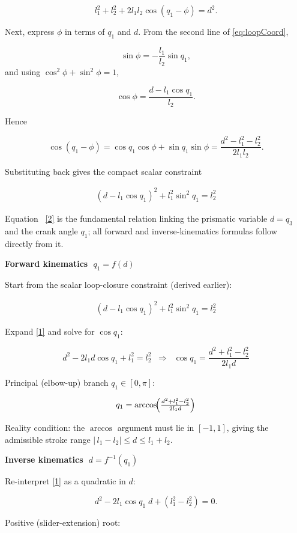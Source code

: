\documentclass[12pt,a4paper]{article}
\begin{document}
\[
l_{1}^{2} + l_{2}^{2} + 2l_{1}l_{2}\cos(q_{1}-\phi) = d^{2}.
\]

Next, express \(\phi\) in terms of \(q_{1}\) and \(d\).
From the second line of \eqref{eq:loopCoord},

\[
\sin\phi = -\frac{l_{1}}{l_{2}}\sin q_{1},
\]
and using \(\cos^{2}\phi+\sin^{2}\phi=1\),

\[
\cos\phi = \frac{d - l_{1}\cos q_{1}}{l_{2}}.
\]

Hence

\[
\cos(q_{1}-\phi)
        = \cos q_{1}\cos\phi + \sin q_{1}\sin\phi
        = \frac{d^{2} - l_{1}^{2} - l_{2}^{2}}{2l_{1}l_{2}}.
\]

Substituting back gives the compact scalar constraint

\begin{align}\label{2}
(d - l_{1}\cos q_{1})^{2} + l_{1}^{2}\sin^{2}q_{1} = l_{2}^{2}
\end{align}

Equation ~\eqref{2} is the fundamental relation linking
the prismatic variable \(d=q_{3}\) and the crank angle \(q_{1}\);
all forward and inverse-kinematics formulas follow directly from it.

\textbf{Forward kinematics  \(\;q_{1}=f(d)\)}

Start from the scalar loop-closure constraint (derived earlier):

\begin{align}\label{1}
(d-l_{1}\cos q_{1})^{2}+l_{1}^{2}\sin^{2}q_{1}=l_{2}^{2}
\end{align}

Expand \eqref{1} and solve for \(\cos q_{1}\):

\[
d^{2}-2l_{1}d\cos q_{1}+l_{1}^{2}=l_{2}^{2}
\;\;\Longrightarrow\;\;
%
\cos q_{1}= \frac{d^{2}+l_{1}^{2}-l_{2}^{2}}{2l_{1}d}
\]

Principal (elbow-up) branch \(q_{1}\in[0,\pi]\):

\[
q_{1}= \arccos\!\Bigl(\tfrac{d^{2}+l_{1}^{2}-l_{2}^{2}}{2l_{1}d}\Bigr)
\]

Reality condition: the $\arccos$ argument must lie in \([-1,1]\), giving the admissible stroke range
\(\bigl|\,l_{1}-l_{2}\bigr|\le d\le l_{1}+l_{2}\).

\textbf{Inverse kinematics  \(\;d=f^{-1}(q_{1})\)}

Re-interpret \eqref{1} as a quadratic in \(d\):

\[
d^{2}-2l_{1}\cos q_{1}\;d + (l_{1}^{2}-l_{2}^{2}) = 0.
\]

Positive (slider-extension) root:
\end{document}
